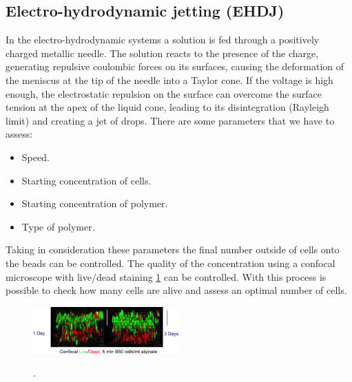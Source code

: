     \subsection{Electro-hydrodynamic jetting (EHDJ)}
    In the electro-hydrodynamic systems a solution is fed through a positively charged metallic needle.
    The solution reacts to the presence of the charge, generating repulsive coulombic forces on its surfaces, causing the deformation of the meniscus at the tip of the needle into a Taylor cone.
    If the voltage is high enough, the electrostatic repulsion on the surface can overcome the surface tension at the apex of the liquid cone, leading to its disintegration (Rayleigh limit) and creating a jet of drops.
    There are some parameters that we have to assess:

    \begin{multicols}{2}
        \begin{itemize}
            \item Speed.
            \item Starting concentration of cells.
            \item Starting concentration of polymer.
            \item Type of polymer.
        \end{itemize}
    \end{multicols}

    Taking in consideration these parameters the final number outside of cells onto the beads can be controlled.
    The quality of the concentration using a confocal microscope with live/dead staining \ref{fig:staining} can be controlled.
    With this process is possible to check how many cells are alive and assess an optimal number of cells.

    \begin{figure}[H]
        \centering
        \includegraphics[width=0.5\textwidth]{staining.png}
        \caption{\label{fig:staining}}.
    \end{figure}
